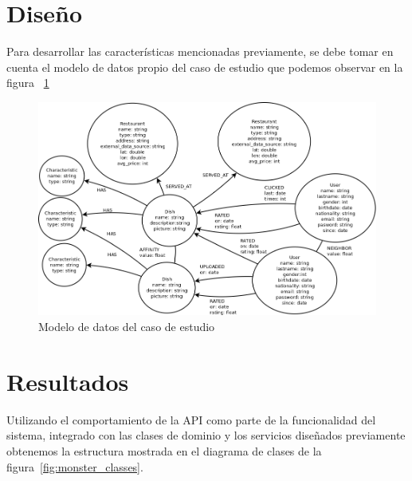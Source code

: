 
  \section{Diseño}

    Para desarrollar las características mencionadas previamente, se debe tomar en cuenta el modelo de datos propio del caso de estudio que podemos observar en la figura ~\ref{fig:model_cs}

    \begin{landscape}
      \begin{figure}[h!]
        \centering
        \includegraphics[width=25cm]{./images/sc_data_model}
        \caption{Modelo de datos del caso de estudio}
        \label{fig:model_cs}
      \end{figure}
    \end{landscape}

  
  \section{Resultados}
    Utilizando el comportamiento de la API como parte de la funcionalidad del sistema, integrado con las clases de dominio y los servicios diseñados previamente obtenemos la estructura mostrada en el diagrama de clases de la figura~\ref{fig:monster_classes}. 

